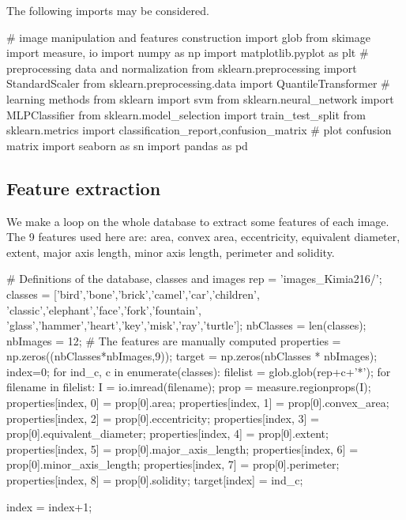 \def\QRCODE{TB_image_TUT.IMG.machine_learning_pythonqrcode.png}
\def\QRPAGE{http://www.iptutorials.science/tree/master/TB_image/TUT.IMG.machine_learning/python}

The following imports may be considered.
\begin{python}
# image manipulation and features construction
import glob
from skimage import measure, io
import numpy as np
import matplotlib.pyplot as plt
# preprocessing data and normalization
from sklearn.preprocessing import StandardScaler
from sklearn.preprocessing.data import QuantileTransformer
# learning methods
from sklearn import svm
from sklearn.neural_network import MLPClassifier
from sklearn.model_selection import train_test_split
from sklearn.metrics import classification_report,confusion_matrix
# plot confusion matrix
import seaborn as sn
import pandas as pd
\end{python}

\subsection{Feature extraction}
We make a loop on the whole database to extract some features of each image. The 9 features used here are: area, convex area, eccentricity, equivalent diameter, extent, major axis length, minor axis length, perimeter and solidity. 

\begin{python}
# Definitions of the database, classes and images
rep = 'images_Kimia216/';
classes = ['bird','bone','brick','camel','car','children',
    'classic','elephant','face','fork','fountain',
    'glass','hammer','heart','key','misk','ray','turtle'];
nbClasses = len(classes);
nbImages = 12;
# The features are manually computed
properties = np.zeros((nbClasses*nbImages,9));
target = np.zeros(nbClasses * nbImages);
index=0;
for ind_c, c in enumerate(classes):
    filelist = glob.glob(rep+c+'*');
    for filename in filelist:
        I = io.imread(filename);
        prop = measure.regionprops(I);
        properties[index, 0] = prop[0].area;
        properties[index, 1] = prop[0].convex_area;
        properties[index, 2] = prop[0].eccentricity;
        properties[index, 3] = prop[0].equivalent_diameter;
        properties[index, 4] = prop[0].extent;
        properties[index, 5] = prop[0].major_axis_length;
        properties[index, 6] = prop[0].minor_axis_length;
        properties[index, 7] = prop[0].perimeter;
        properties[index, 8] = prop[0].solidity;
        target[index] = ind_c;
        
        index = index+1;
\end{python}

